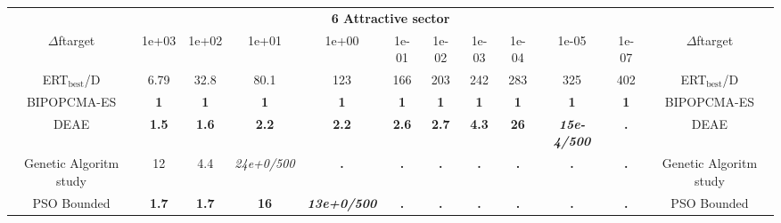 \begin{tabular}{cccccccccccc}
 & \multicolumn{10}{c}{{\normalsize \textbf{6 Attractive sector}}}\\
$\Delta$ftarget& 1e+03& 1e+02& 1e+01& 1e+00& 1e-01& 1e-02& 1e-03& 1e-04& 1e-05& 1e-07 & $\Delta$ftarget \\
ERT$_{\textrm{best}}$/D& 6.79& 32.8& 80.1& 123& 166& 203& 242& 283& 325& 402 & ERT$_{\textrm{best}}$/D \\
\hline
BIPOPCMA-ES & \textbf{1} & \textbf{1} & \textbf{1} & \textbf{1} & \textbf{1} & \textbf{1} & \textbf{1} & \textbf{1} & \textbf{1} & \textbf{1} & BIPOPCMA-ES \cite{add_an_entry_for_BIPOPCMA-ES_in_bbob.bib}\\
DEAE & \textbf{1.5} & \textbf{1.6} & \textbf{2.2} & \textbf{2.2} & \textbf{2.6} & \textbf{2.7} & \textbf{4.3} & \textbf{26} & \textbf{\textit{15e-4}\textit{/500}} & \textbf{.} & DEAE \cite{add_an_entry_for_DEAE_in_bbob.bib}\\
Genetic Algoritm study & 12 & 4.4 & \textit{24e+0}\textit{/500} & \textbf{.} & \textbf{.} & \textbf{.} & \textbf{.} & \textbf{.} & \textbf{.} & \textbf{.} & Genetic Algoritm study \cite{add_an_entry_for_Genetic Algoritm study_in_bbob.bib}\\
PSO Bounded & \textbf{1.7} & \textbf{1.7} & \textbf{16} & \textbf{\textit{13e+0}\textit{/500}} & \textbf{.} & \textbf{.} & \textbf{.} & \textbf{.} & \textbf{.} & \textbf{.} & PSO Bounded \cite{add_an_entry_for_PSO Bounded_in_bbob.bib}
\end{tabular}
